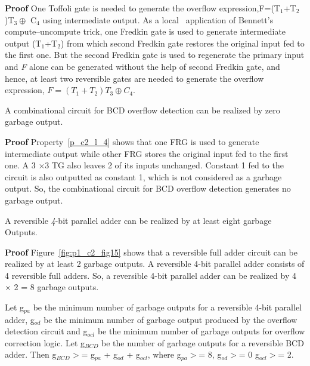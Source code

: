\noindent\textbf{Proof} One Toffoli gate is needed to generate the overflow expression,F=(T${}_{1}$+T${}_{2}$)T${}_{3}\oplus$ C${}_{4}$ using intermediate output. As a local~ application of Bennett's compute--uncompute trick, one Fredkin gate is used to generate intermediate output (T${}_{1}$+T${}_{2}$) from which second Fredkin gate restores the original input fed to the first one. But the second Fredkin gate is used to regenerate the primary input and \textit{F} alone can be generated without the help of second Fredkin gate, and hence, at least two reversible gates are needed to generate the overflow expression, $F = (T{}_{1}+T{}_{2})T{}_{3}\oplus C{}_{4}$.


\begin{property}\label{p_c2_l_4}\textnormal{
A combinational circuit for BCD overflow detection can be realized by zero garbage output.}
\end{property}


\noindent\textbf{Proof}
Property~\ref{p_c2_l_4} shows that one FRG is used to generate intermediate output while other FRG stores the original input fed to the first one. A 3 ${\times}$3 TG also leaves 2 of its inputs unchanged. Constant 1 fed to the circuit is also outputted as constant 1, which is not considered as a garbage output. So, the combinational circuit for BCD overflow detection generates no garbage output.


\begin{property}\label{p_c2_l_5}\textnormal{
A reversible {\it 4}-bit parallel adder can be realized by at least eight garbage Outputs.}
\end{property}

\noindent\textbf{Proof}
Figure~\ref{fig:p1_c2_fig15} shows that a reversible full adder circuit can be realized by at least 2 garbage outputs. A reversible {4}-bit parallel adder consists of 4 reversible full adders. So, a reversible {4}-bit parallel adder can be realized by 4 ${\times}$ 2 = 8 garbage outputs.


\begin{property}\label{p_c2_l_6}\textnormal{
Let g${}_{pa}$ be the minimum number of garbage outputs for a reversible 4-bit parallel adder, g${}_{od}$ be the minimum number of garbage output produced by the overflow detection circuit and g${}_{ocl}$ be the minimum number of garbage outputs for overflow correction logic. Let g${}_{BCD}$ be the number of garbage outputs for a reversible BCD adder. Then
g${}_{BCD}$${>}$= g${}_{pa}$ + g${}_{od}$ + g${}_{ocl}$, where g${}_{pa}$${>}$= 8, g${}_{od}$${>}$= 0 g${}_{ocl}$${>}$= 2.}
\end{property}


